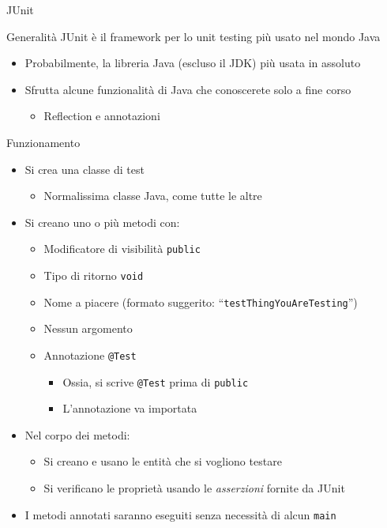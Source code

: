 \documentclass[xcolor=dvipsnames,presentation]{beamer}
\begin{document}
\begin{frame}[allowframebreaks]{JUnit}
	\begin{block}{Generalità}
		JUnit è il framework per lo unit testing più usato nel mondo Java
		\begin{itemize}
			\item Probabilmente, la libreria Java (escluso il JDK) più usata in assoluto
			\item Sfrutta alcune funzionalità di Java che conoscerete solo a fine corso
			\begin{itemize}
				\item Reflection e annotazioni
			\end{itemize}
		\end{itemize}
	\end{block}
	\begin{block}{Funzionamento}
		\begin{itemize}
			\item Si crea una classe di test
			\begin{itemize}
				\item Normalissima classe Java, come tutte le altre
			\end{itemize}
			\item Si creano uno o più metodi con:
			\begin{itemize}
				\item Modificatore di visibilità \texttt{public}
				\item Tipo di ritorno \texttt{void}
				\item Nome a piacere (formato suggerito: ``\texttt{testThingYouAreTesting}'')
				\item Nessun argomento
				\item Annotazione \texttt{@Test}
				\begin{itemize}
					\item Ossia, si scrive \texttt{@Test} prima di \texttt{public}
					\item L'annotazione va importata
				\end{itemize}
			\end{itemize}
			\item Nel corpo dei metodi:
			\begin{itemize}
				\item Si creano e usano le entità che si vogliono testare
				\item Si verificano le proprietà usando le \textit{asserzioni} fornite da JUnit
			\end{itemize}
			\item I metodi annotati saranno eseguiti senza necessità di alcun \texttt{main}

\end{itemize}
\end{block}
\end{frame}
\end{document}
